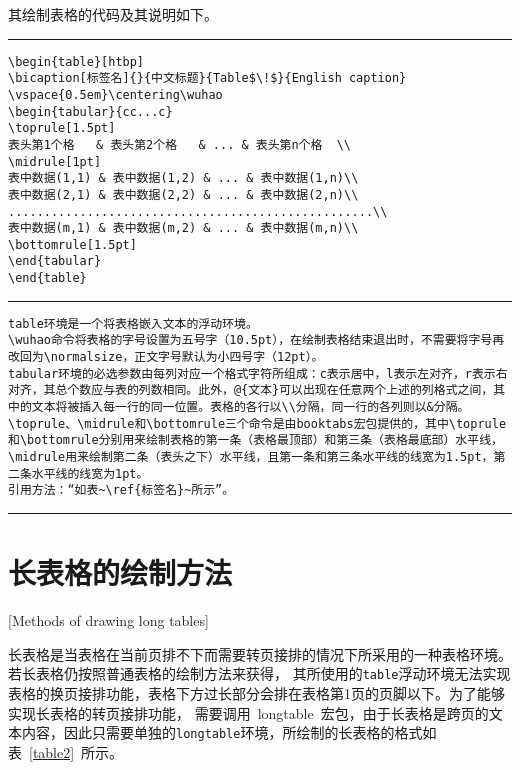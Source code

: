 其绘制表格的代码及其说明如下。
\vspace{1em}\noindent\hrule
\begin{lstlisting}
\begin{table}[htbp]
\bicaption[标签名]{}{中文标题}{Table$\!$}{English caption}
\vspace{0.5em}\centering\wuhao
\begin{tabular}{cc...c}
\toprule[1.5pt]
表头第1个格   & 表头第2个格   & ... & 表头第n个格  \\
\midrule[1pt]
表中数据(1,1) & 表中数据(1,2) & ... & 表中数据(1,n)\\
表中数据(2,1) & 表中数据(2,2) & ... & 表中数据(2,n)\\
...................................................\\
表中数据(m,1) & 表中数据(m,2) & ... & 表中数据(m,n)\\
\bottomrule[1.5pt]
\end{tabular}
\end{table}
\end{lstlisting}
\noindent\hrule
\begin{lstlisting}
table环境是一个将表格嵌入文本的浮动环境。
\wuhao命令将表格的字号设置为五号字（10.5pt），在绘制表格结束退出时，不需要将字号再改回为\normalsize，正文字号默认为小四号字（12pt）。
tabular环境的必选参数由每列对应一个格式字符所组成：c表示居中，l表示左对齐，r表示右对齐，其总个数应与表的列数相同。此外，@{文本}可以出现在任意两个上述的列格式之间，其中的文本将被插入每一行的同一位置。表格的各行以\\分隔，同一行的各列则以&分隔。
\toprule、\midrule和\bottomrule三个命令是由booktabs宏包提供的，其中\toprule和\bottomrule分别用来绘制表格的第一条（表格最顶部）和第三条（表格最底部）水平线，\midrule用来绘制第二条（表头之下）水平线，且第一条和第三条水平线的线宽为1.5pt，第二条水平线的线宽为1pt。
引用方法：“如表~\ref{标签名}~所示”。
\end{lstlisting}
\noindent\hrule

\section{长表格的绘制方法}[Methods of drawing long tables]

长表格是当表格在当前页排不下而需要转页接排的情况下所采用的一种表格环境。若长表格仍按照普通表格的绘制方法来获得，
其所使用的\verb|table|浮动环境无法实现表格的换页接排功能，表格下方过长部分会排在表格第1页的页脚以下。为了能够实现长表格的转页接排功能，
需要调用~longtable~宏包，由于长表格是跨页的文本内容，因此只需要单独的\verb|longtable|环境，所绘制的长表格的格式如表~\ref{table2}~所示。

